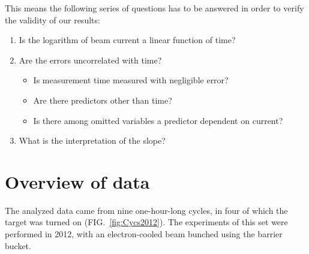 \documentclass[reprint]{revtex4-1}
\begin{document}
This means the following series of questions has to be answered in order to verify the validity of our results:
\begin{enumerate}
	\item Is the logarithm of beam current a linear function of time?
	\item Are the errors uncorrelated with time?
		\begin{itemize}
			\item Is measurement time measured with negligible error?
			\item Are there predictors other than time?
			\item Is there among omitted variables a predictor dependent on current?
		\end{itemize}
	\item What is the interpretation of the slope?
\end{enumerate}


\section{Overview of data}
The analyzed data came from nine one-hour-long cycles, in four of which the target was turned on (FIG.~\ref{fig:Cycs2012}). The experiments of this set were performed in 2012, with an electron-cooled beam bunched using the barrier bucket.
\end{document}
